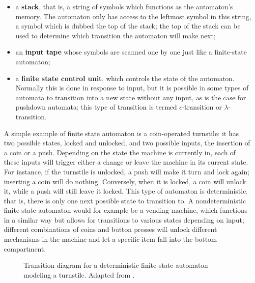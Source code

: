 \begin{itemize} 
  
  \item a \textbf{stack}, that is, a string of symbols which functions as the
    automaton's memory. The automaton only has access to the leftmost symbol in
    this string, a symbol which is dubbed the top of the stack; the top of the
    stack can be used to determine which transition the automaton will make
    next;
    
  \item an \textbf{input tape} whose symbols are scanned one by one just like a
    finite-state automaton; 
    
    \item a \textbf{finite state control unit}, which controls the state of the
      automaton. Normally this is done in response to input, but it is possible
      in some types of automata to transition into a new state without any
      input, as is the case for pushdown automata; this type of transition is
      termed $\epsilon$-transition or $\lambda$-transition.
    
\end{itemize}

A simple example of finite state automaton is a coin-operated turnstile: it has
two possible states, locked and unlocked, and two possible inputs, the
insertion of a coin or a push. Depending on the state the machine is currently
in, each of these inputs will trigger either a change or leave the machine in
its current state. For instance, if the turnstile is unlocked, a push will make
it turn and lock again; inserting a coin will do nothing.  Conversely, when it
is locked, a coin will unlock it, while a push will still leave it locked. This
type of automaton is deterministic, that is, there is only one next possible
state to transition to. A nondeterministic finite state automaton would for
example be a vending machine, which functions in a similar way but allows for
transitions to various states depending on input; different combinations of
coins and button presses will unlock different mechanisms in the machine and
let a specific item fall into the bottom compartment.

\begin{figure}
\caption{Transition diagram for a deterministic finite state automaton modeling a turnstile. Adapted from \citet[762]{koshy2004}.} \label{fig:turnstile}
\end{figure}

